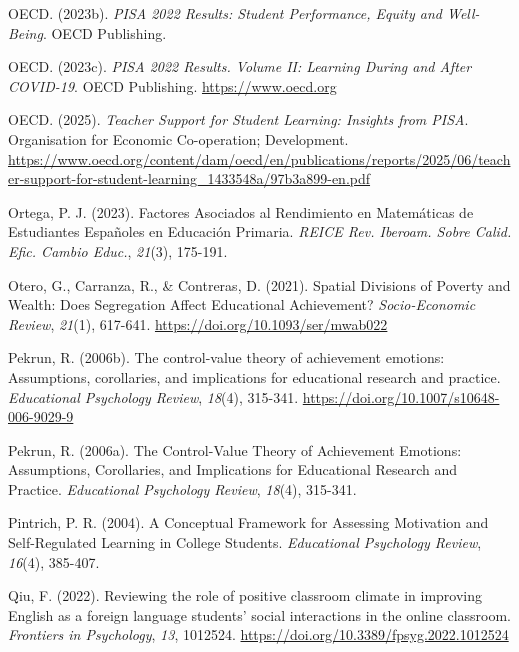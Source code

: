 \documentclass[
  spanish,
  a4paper,
  oneside]{scrbook}
\newlength{\cslhangindent}
\newenvironment{CSLReferences}[2] %
 {\begin{list}{}{%
  \setlength{\itemindent}{0pt}
  \setlength{\leftmargin}{0pt}
  \setlength{\parsep}{0pt}
  \ifodd #1
   \setlength{\leftmargin}{\cslhangindent}
   \setlength{\itemindent}{-1\cslhangindent}
  \fi
  \setlength{\itemsep}{#2\baselineskip}}}
 {\end{list}}
\begin{document}
\begin{CSLReferences}{1}{0}
OECD. (2023b). \emph{PISA 2022 Results: Student Performance, Equity and
Well-Being}. OECD Publishing.

OECD. (2023c). \emph{PISA 2022 Results. Volume II: Learning During and
After COVID-19}. OECD Publishing. \url{https://www.oecd.org}

OECD. (2025). \emph{Teacher Support for Student Learning: Insights from
PISA}. Organisation for Economic Co-operation; Development.
\url{https://www.oecd.org/content/dam/oecd/en/publications/reports/2025/06/teacher-support-for-student-learning_1433548a/97b3a899-en.pdf}

Ortega, P. J. (2023). Factores Asociados al Rendimiento en Matem{á}ticas
de Estudiantes Espa{ñ}oles en Educaci{ó}n Primaria. \emph{REICE Rev.
Iberoam. Sobre Calid. Efic. Cambio Educ.}, \emph{21}(3), 175-191.

Otero, G., Carranza, R., \& Contreras, D. (2021). Spatial Divisions of
Poverty and Wealth: Does Segregation Affect Educational Achievement?
\emph{Socio-Economic Review}, \emph{21}(1), 617-641.
\url{https://doi.org/10.1093/ser/mwab022}

Pekrun, R. (2006b). The control-value theory of achievement emotions:
Assumptions, corollaries, and implications for educational research and
practice. \emph{Educational Psychology Review}, \emph{18}(4), 315-341.
\url{https://doi.org/10.1007/s10648-006-9029-9}

Pekrun, R. (2006a). The Control-Value Theory of Achievement Emotions:
Assumptions, Corollaries, and Implications for Educational Research and
Practice. \emph{Educational Psychology Review}, \emph{18}(4), 315-341.

Pintrich, P. R. (2004). A Conceptual Framework for Assessing Motivation
and Self-Regulated Learning in College Students. \emph{Educational
Psychology Review}, \emph{16}(4), 385-407.

Qiu, F. (2022). Reviewing the role of positive classroom climate in
improving English as a foreign language students' social interactions in
the online classroom. \emph{Frontiers in Psychology}, \emph{13},
1012524. \url{https://doi.org/10.3389/fpsyg.2022.1012524}


\end{CSLReferences}
\end{document}
